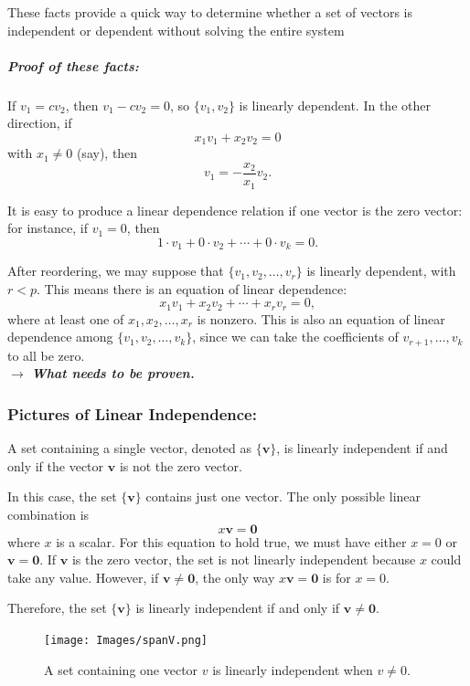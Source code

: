 \documentclass[a4paper,12pt]{article}
\begin{document}
These facts provide a quick way to determine whether a set of vectors is independent or dependent without solving the entire system\\
\subparagraph{Proof of these facts:} If \( v_1 = c v_2 \), then \( v_1 - c v_2 = 0 \), so \(\{v_1, v_2\}\) is linearly dependent.  
In the other direction, if  
\[
x_1 v_1 + x_2 v_2 = 0
\]  
with \(x_1 \neq 0\) (say), then  
\[
v_1 = -\frac{x_2}{x_1} v_2.
\]  

It is easy to produce a linear dependence relation if one vector is the zero vector: for instance, if \(v_1 = 0\), then  
\[
1 \cdot v_1 + 0 \cdot v_2 + \cdots + 0 \cdot v_k = 0.
\]

After reordering, we may suppose that \(\{v_1, v_2, \dots, v_r\}\) is linearly dependent, with \(r < p\).  
This means there is an equation of linear dependence:  
\[
x_1 v_1 + x_2 v_2 + \cdots + x_r v_r = 0,
\]  
where at least one of \(x_1, x_2, \dots, x_r\) is nonzero. This is also an equation of linear dependence among \(\{v_1, v_2, \dots, v_k\}\),  
since we can take the coefficients of \(v_{r+1}, \dots, v_k\) to all be zero.\\
$\rightarrow$ \textbf{\textit{What needs to be proven.}}

\subsubsection{Pictures of Linear Independence:}
A set containing a single vector, denoted as \(\{ \mathbf{v} \}\), is linearly independent if and only if the vector \(\mathbf{v}\) is not the zero vector.

In this case, the set \(\{ \mathbf{v} \}\) contains just one vector. The only possible linear combination is \[x \mathbf{v} = \mathbf{0}\]where \(x\) is a scalar. For this equation to hold true, we must have either \(x = 0\) or \(\mathbf{v} = \mathbf{0}\). If \(\mathbf{v}\) is the zero vector, the set is not linearly independent because \(x\) could take any value. However, if \(\mathbf{v} \neq \mathbf{0}\), the only way \(x \mathbf{v} = \mathbf{0}\) is for \(x = 0\). 

Therefore, the set \(\{ \mathbf{v} \}\) is linearly independent if and only if \(\mathbf{v} \neq \mathbf{0}\).
\begin{figure}
    \centering
    \texttt{[image: Images/spanV.png]}
    \caption{A set containing one vector \( v \) is linearly independent when \( v \neq 0 \).}

    \label{fig:enter-label}
\end{figure}\\
\end{document}
